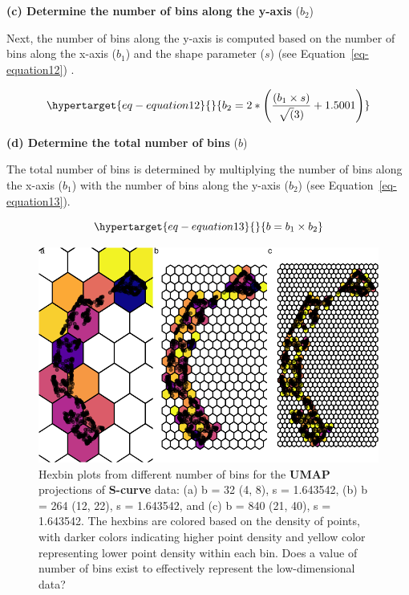 \documentclass[
  12pt]{article}
\begin{document}
\textbf{(c) Determine the number of bins along the y-axis} (\(b_2\))

Next, the number of bins along the y-axis is computed based on the
number of bins along the x-axis (\(b_1\)) and the shape parameter
(\(s\)) (see Equation~\ref{eq-equation12}) \citep{Carr2013}.

\begin{equation}\protect\hypertarget{eq-equation12}{}{
b_2 = 2 * \left(\frac{(b_1 \times s)}{\sqrt(3)} + 1.5001 \right)
}\label{eq-equation12}\end{equation}

\textbf{(d) Determine the total number of bins} (\(b\))

The total number of bins is determined by multiplying the number of bins
along the x-axis (\(b_1\)) with the number of bins along the y-axis
(\(b_2\)) (see Equation~\ref{eq-equation13}).

\begin{equation}\protect\hypertarget{eq-equation13}{}{
b = b_1 \times b_2
}\label{eq-equation13}\end{equation}

\begin{figure}[H]

{\centering \includegraphics{paper_files/figure-pdf/fig-binsize-1.pdf}

}

\caption{\label{fig-binsize}Hexbin plots from different number of bins
for the \textbf{UMAP} projections of \textbf{S-curve} data: (a) b = 32
(4, 8), s = 1.643542, (b) b = 264 (12, 22), s = 1.643542, and (c) b =
840 (21, 40), s = 1.643542. The hexbins are colored based on the density
of points, with darker colors indicating higher point density and yellow
color representing lower point density within each bin. Does a value of
number of bins exist to effectively represent the low-dimensional data?}

\end{figure}
\end{document}
